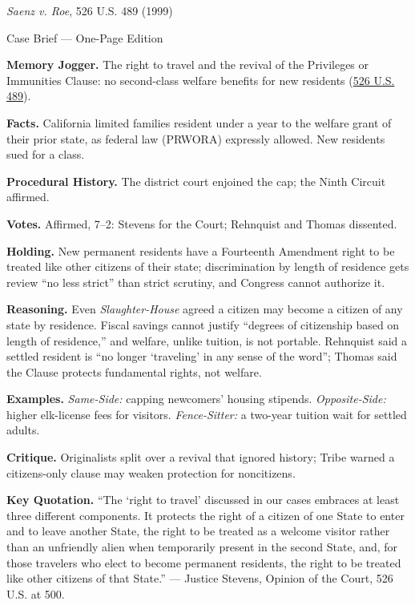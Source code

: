\documentclass[12pt]{article}
\begin{document}
\begin{center}
{\Large \textit{Saenz v. Roe}, 526 U.S. 489 (1999)\par}
\vspace{0.3em}
{\normalsize Case Brief --- One-Page Edition\par}
\end{center}

\textbf{Memory Jogger.} The right to travel and the revival of the Privileges or Immunities Clause: no second-class welfare benefits for new residents (\href{https://www.law.cornell.edu/supremecourt/text/98-97}{526 U.S. 489}).

\textbf{Facts.} California limited families resident under a year to the welfare grant of their prior state, as federal law (PRWORA) expressly allowed. New residents sued for a class.

\textbf{Procedural History.} The district court enjoined the cap; the Ninth Circuit affirmed.

\textbf{Votes.} Affirmed, 7--2: Stevens for the Court; Rehnquist and Thomas dissented.

\textbf{Holding.} New permanent residents have a Fourteenth Amendment right to be treated like other citizens of their state; discrimination by length of residence gets review ``no less strict'' than strict scrutiny, and Congress cannot authorize it.

\textbf{Reasoning.} Even \textit{Slaughter-House} agreed a citizen may become a citizen of any state by residence. Fiscal savings cannot justify ``degrees of citizenship based on length of residence,'' and welfare, unlike tuition, is not portable. Rehnquist said a settled resident is ``no longer `traveling' in any sense of the word''; Thomas said the Clause protects fundamental rights, not welfare.

\textbf{Examples.} \emph{Same-Side:} capping newcomers' housing stipends. \emph{Opposite-Side:} higher elk-license fees for visitors. \emph{Fence-Sitter:} a two-year tuition wait for settled adults.

\textbf{Critique.} Originalists split over a revival that ignored history; Tribe warned a citizens-only clause may weaken protection for noncitizens.

\textbf{Key Quotation.} ``The `right to travel' discussed in our cases embraces at least three different components. It protects the right of a citizen of one State to enter and to leave another State, the right to be treated as a welcome visitor rather than an unfriendly alien when temporarily present in the second State, and, for those travelers who elect to become permanent residents, the right to be treated like other citizens of that State.'' --- Justice Stevens, Opinion of the Court, 526 U.S. at 500.
\end{document}
